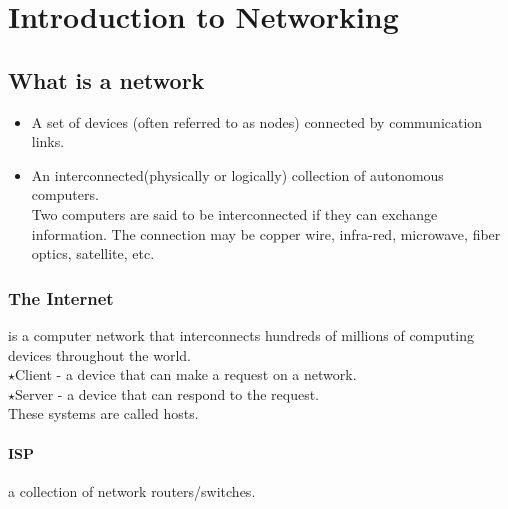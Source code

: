 \documentclass[10pt, a4paper]{report}
\begin{document}
	\chapter{Introduction to Networking}
	\section{What is a network}
	\begin{itemize}
		\item A set of devices (often referred to as nodes) connected by communication links.
		\item An interconnected(physically or logically) collection of autonomous computers. \\
		Two computers are said to be interconnected if they can exchange information. The connection may be copper wire, infra-red, microwave, fiber optics, satellite, etc.
	\end{itemize}
	\subsection{The Internet} is a computer network that interconnects hundreds of millions of computing devices throughout the world.\\
	$\star$Client - a device that can make a request on a network.\\
	$\star$Server - a device that can respond to the request.\\
	These systems are called hosts.
	\subsubsection{ISP} a collection of network routers/switches. 
\end{document}
